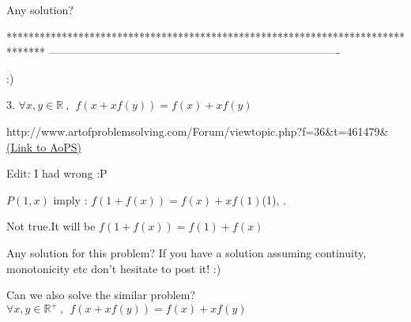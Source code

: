 \begin{solution}
	Any solution?
\end{solution}
*******************************************************************************
-------------------------------------------------------------------------------

\begin{problem}
	:)

3. $\forall x, y \in \mathbb{R} \ , \  \  f(x+xf(y))=f(x)+xf(y)$

http://www.artofproblemsolving.com/Forum/viewtopic.php?f=36&t=461479&
	\flushright \href{https://artofproblemsolving.com/community/c6h477809}{(Link to AoPS)}
\end{problem}



\begin{solution}
	Edit: I had wrong  :P
\end{solution}



\begin{solution}
	\begin{tcolorbox}$P(1,x)$ imply : $f(1+f(x))=f(x)+xf(1)$(1),  .\end{tcolorbox}
Not true.It will be
$f(1+f(x))=f(1)+f(x)$
\end{solution}






\begin{solution}
	Any solution for this problem? If you have a solution assuming continuity, monotonicity etc don't hesitate to post it! :) 

Can we also solve the similar problem?
$ \forall x, y \in \mathbb{R}^+ \ , \  \  f(x+xf(y))=f(x)+xf(y)$
\end{solution}




